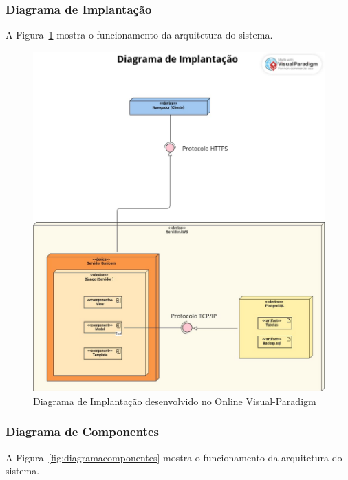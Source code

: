 \documentclass[
	12pt,				%
	openany,			%
	oneside,			%
	a4paper,			%
	english,			%
	french,				%
	spanish,			%
	brazil				%
	]{abntex2}
\begin{document}
\subsubsection{Diagrama de Implantação}
A Figura~\ref{fig:diagramaimplantação} mostra o funcionamento da arquitetura do sistema.

\begin{figure}[H]
	\centering
	\includegraphics[width=\textwidth]{Diagrama de Implantação- Digitalização da Pousada.JPEG}
	\caption{Diagrama de Implantação desenvolvido no Online Visual-Paradigm}
	\label{fig:diagramaimplantação}
\end{figure}
\subsubsection{Diagrama de Componentes}
A Figura~\ref{fig:diagramacomponentes} mostra o funcionamento da arquitetura do sistema.
\end{document}
